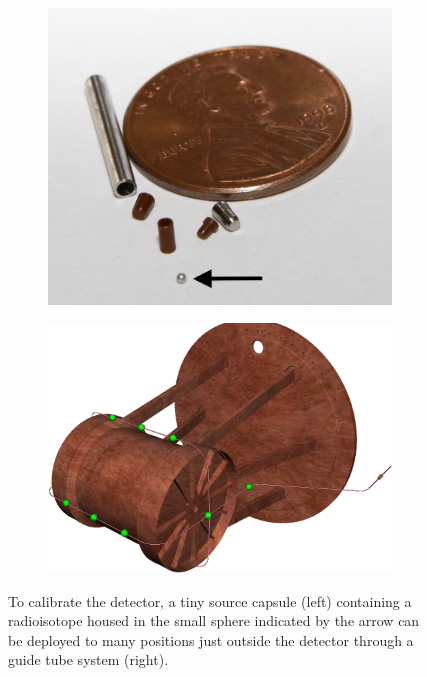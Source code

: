 \documentclass[herrin-thesis.tex]{subfiles}
\begin{document}
\begin{figure}[htbp]
\centering
\begin{subfigure}[c]{0.33\linewidth}
\includegraphics[width=\textwidth]{./photos/source_capsule_annotated.png}
\end{subfigure}\hspace{0.05\linewidth}\hfill%
\begin{subfigure}[c]{0.60\linewidth}
\includegraphics[width=\textwidth]{./photos/calibration_tubing_cropped.png}
\end{subfigure}
\caption[The calibration system]{To calibrate the detector, a tiny source capsule (left) containing a radioisotope housed in the small sphere indicated by the arrow can be deployed to many positions just outside the detector through a guide tube system (right).}
\label{fig:detector_calibration}
\end{figure}
\end{document}
